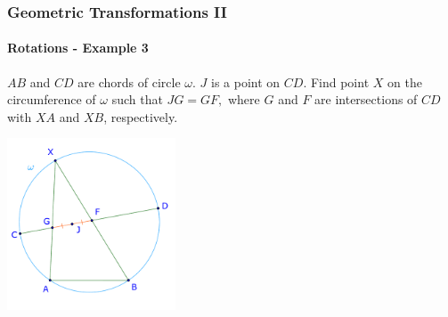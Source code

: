 \documentclass[8pt,xcolor=table,dvipsnames]{beamer}
\begin{document}
\begin{frame}[t]
    \frametitle{Geometric Transformations II}
    \framesubtitle{Rotations - Example 3}
    \begin{example}
        $AB$ and $CD$ are chords of circle $\omega$. $J$ is a point on $CD$. Find point $X$ on the circumference of $\omega$ such that $JG = GF,$
        where $G$ and $F$ are intersections of $CD$ with $XA$ and $XB$, respectively.
    \end{example}

    \begin{center}
        \includegraphics[width=5cm]{./svg/pdf/rotation-3a.pdf}
    \end{center}
\end{frame}
\end{document}
